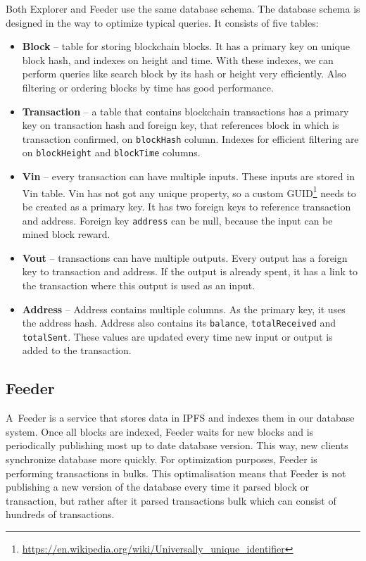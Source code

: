 Both Explorer and Feeder use the same database schema. The database schema is designed in the way to optimize typical queries. It consists of five tables:
\begin{itemize}
    \item \textbf{Block} -- table for storing blockchain blocks. It has a primary key on unique block hash, and indexes on height and time. With these indexes, we can perform queries like search block by its hash or height very efficiently. Also filtering or ordering blocks by time has good performance.
    \item \textbf{Transaction} -- a table that contains blockchain transactions has a primary key on transaction hash and foreign key, that references block in which is transaction confirmed, on \texttt{blockHash} column. Indexes for efficient filtering are on \texttt{blockHeight} and \texttt{blockTime} columns. 
    \item \textbf{Vin} -- every transaction can have multiple inputs. These inputs are stored in Vin table. Vin has not got any unique property, so a custom GUID\footnote{\url{https://en.wikipedia.org/wiki/Universally_unique_identifier}} needs to be created as a primary key. It has two foreign keys to reference transaction and address. Foreign key \texttt{address} can be null, because the input can be mined block reward.
    \item \textbf{Vout} -- transactions can have multiple outputs. Every output has a foreign key to transaction and address. If the output is already spent, it has a link to the transaction where this output is used as an input.
    \item \textbf{Address} -- Address contains multiple columns. As the primary key, it uses the address hash. Address also contains its \texttt{balance}, \texttt{totalReceived} and \texttt{totalSent}. These values are updated every time new input or output is added to the transaction.  
\end{itemize}



\subsection{Feeder}
A~Feeder is a service that stores data in IPFS and indexes them in our database system. Once all blocks are indexed, Feeder waits for new blocks and is periodically publishing most up to date database version. This way, new clients synchronize database more quickly. For optimization purposes, Feeder is performing transactions in bulks. This optimalisation means that Feeder is not publishing a new version of the database every time it parsed block or transaction, but rather after it parsed transactions bulk which can consist of hundreds of transactions.  

